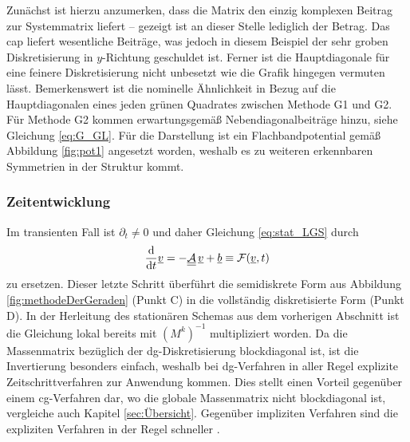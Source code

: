 Zunächst ist hierzu anzumerken, dass die Matrix den einzig komplexen Beitrag zur Systemmatrix liefert -- gezeigt ist an dieser Stelle lediglich der Betrag. Das \ac{cap} liefert wesentliche Beiträge, was jedoch in diesem Beispiel der sehr groben Diskretisierung in $y$-Richtung geschuldet ist. Ferner ist die Hauptdiagonale für eine feinere Diskretisierung nicht unbesetzt wie die Grafik hingegen vermuten lässt. Bemerkenswert ist die nominelle Ähnlichkeit in Bezug auf die Hauptdiagonalen eines jeden grünen Quadrates zwischen Methode G1 und G2. Für Methode G2 kommen erwartungsgemäß Nebendiagonalbeiträge hinzu, siehe Gleichung \eqref{eq:G_GL}. Für die Darstellung ist ein Flachbandpotential gemäß Abbildung \ref{fig:pot1} angesetzt worden, weshalb es zu weiteren erkennbaren Symmetrien in der Struktur kommt.

\subsubsection{Zeitentwicklung} \label{sec:timestepping}  
Im transienten Fall ist $\partial_t\neq 0$ und daher Gleichung \eqref{eq:stat_LGS} durch
\begin{equation}
  \frac{\mathrm{d}}{\mathrm{d}t} \underline{v} = -\underline{\underline{\mathcal{A}}}\,\underline{v} + \underline{b} \equiv\mathcal{F}(\underline{v},t)
  \label{eq:system_transient}
\end{equation}
zu ersetzen. Dieser letzte Schritt überführt die semidiskrete Form aus Abbildung \ref{fig:methodeDerGeraden} (Punkt C) in die vollständig diskretisierte Form (Punkt D). In der Herleitung des stationären Schemas aus dem vorherigen Abschnitt ist die Gleichung lokal bereits mit $(M^k)^{-1}$ multipliziert worden. Da die Massenmatrix bezüglich der \ac{dg}-Diskretisierung blockdiagonal ist, ist die Invertierung besonders einfach, weshalb bei \ac{dg}-Verfahren in aller Regel explizite Zeitschrittverfahren zur Anwendung kommen. Dies stellt einen Vorteil gegenüber einem \ac{cg}-Verfahren dar, wo die globale Massenmatrix nicht blockdiagonal ist, vergleiche auch Kapitel \ref{sec:Übersicht}. Gegenüber impliziten Verfahren sind die expliziten Verfahren in der Regel schneller \cite{buchLeveque}.

